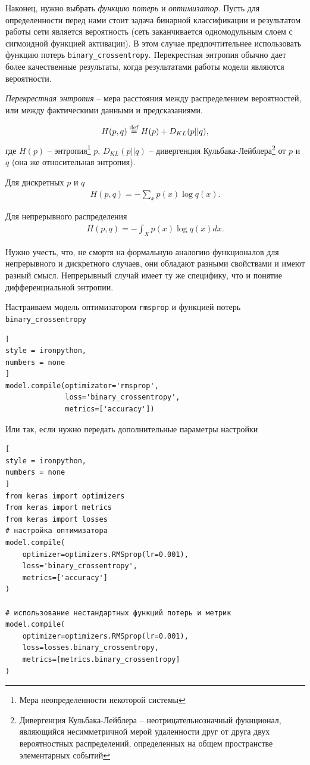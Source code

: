 \documentclass[%
	11pt,
	a4paper,
	utf8,
		]{article}
\begin{document}
Наконец, нужно выбрать \emph{функцию потерь} и \emph{оптимизатор}. Пусть для определенности перед нами стоит задача бинарной классификации и результатом работы сети является вероятность (сеть заканчивается одномодульным слоем с сигмоидной функцией активации). В этом случае предпочтительнее использовать функцию потерь \texttt{binary\_crossentropy}. Перекрестная энтропия обычно дает более качественные результаты, когда результатами работы модели являются вероятности.

\emph{Перекрестная энтропия} -- мера расстояния между распределением вероятностей, или между фактическими данными и предсказаниями.

\begin{align*}
	H(p,q) \stackrel{\mathrm{def}}{=} H(p) + D_{KL}(p||q),
\end{align*}
где $ H(p) $ -- энтропия\footnote{Мера неопределенности некоторой системы} $ p $, $ D_{KL}(p||q) $ -- дивергенция Кульбака-Лейблера\footnote{Дивергенция Кульбака-Лейблера -- неотрицательнозначный фукнционал, являющийся несимметричной мерой удаленности друг от друга двух вероятностных распределений, определенных на общем пространстве элементарных событий} от $ p $ и $ q $ (она же относительная энтропия).

Для дискретных $ p $ и $ q $
\begin{align*}
	H(p,q) = - \sum_{x} p(x) \log q(x).
\end{align*}

Для непрерывного распределения
\begin{align*}
	H(p,q) = - \int_{X} p(x) \log q(x) dx.
\end{align*}

Нужно учесть, что, не смортя на формальную аналогию функционалов для непрерывного и дискретного случаев, они обладают разными свойствами и имеют разный смысл. Непрерывный случай имеет ту же специфику, что и понятие дифференциальной энтропии.

Настраиваем модель оптимизатором \texttt{rmsprop} и функцией потерь \texttt{binary\_crossentropy}
\begin{lstlisting}[
style = ironpython,
numbers = none
]
model.compile(optimizator='rmsprop',
              loss='binary_crossentropy',
              metrics=['accuracy'])
\end{lstlisting}

Или так, если нужно передать дополнительные параметры настройки
\begin{lstlisting}[
style = ironpython,
numbers = none
]
from keras import optimizers
from keras import metrics
from keras import losses
# настройка оптимизатора
model.compile(
    optimizer=optimizers.RMSprop(lr=0.001),
    loss='binary_crossentropy',
    metrics=['accuracy']
)

# использование нестандартных функций потерь и метрик
model.compile(
    optimizer=optimizers.RMSprop(lr=0.001),
    loss=losses.binary_crossentropy,
    metrics=[metrics.binary_crossentropy]
)
\end{lstlisting}
\end{document}

